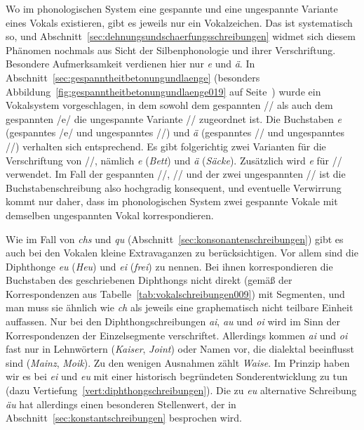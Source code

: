 Wo im phonologischen System eine gespannte und eine ungespannte Variante eines Vokals existieren, gibt es jeweils nur ein Vokalzeichen.
Das ist systematisch so, und Abschnitt~\ref{sec:dehnungsundschaerfungsschreibungen} widmet sich diesem Phänomen nochmals aus Sicht der Silbenphonologie und ihrer Verschriftung.
Besondere Aufmerksamkeit verdienen hier nur \textit{e} und \textit{ä}.
In Abschnitt~\ref{sec:gespanntheitbetonungundlaenge} (besonders Abbildung~\ref{fig:gespanntheitbetonungundlaenge019} auf Seite~\pageref{fig:gespanntheitbetonungundlaenge019}) wurde ein Vokalsystem vorgeschlagen, in dem sowohl dem gespannten // als auch dem gespannten /e/ die ungespannte Variante // zugeordnet ist.
Die Buchstaben \textit{e} (gespanntes /e/ und ungespanntes //) und \textit{ä} (gespanntes // und ungespanntes //) verhalten sich entsprechend.
Es gibt folgerichtig zwei Varianten für die Verschriftung von //, nämlich \textit{e} (\textit{Bett}) und \textit{ä} (\textit{Säcke}).
Zusätzlich wird \textit{e} für // verwendet.
Im Fall der gespannten //, // und der zwei ungespannten // ist die Buchstabenschreibung also hochgradig konsequent, und eventuelle Verwirrung kommt nur daher, dass im phonologischen System zwei gespannte Vokale mit demselben ungespannten Vokal korrespondieren.

Wie im Fall von \textit{chs} und \textit{qu} (Abschnitt~\ref{sec:konsonantenschreibungen}) gibt es auch bei den Vokalen kleine Extravaganzen zu berücksichtigen.
Vor allem sind die Diphthonge \textit{eu} (\textit{Heu}) und \textit{ei} (\textit{frei}) zu nennen.
Bei ihnen korrespondieren die Buchstaben des geschriebenen Diphthongs nicht direkt (gemäß der Korrespondenzen aus Tabelle~\ref{tab:vokalschreibungen009}) mit Segmenten, und man muss sie ähnlich wie \textit{ch} als jeweils eine graphematisch nicht teilbare Einheit auffassen.
Nur bei den Diphthongschreibungen \textit{ai}, \textit{au} und \textit{oi} wird im Sinn der Korrespondenzen der Einzelsegmente verschriftet.
Allerdings kommen \textit{ai} und \textit{oi} fast nur in Lehnwörtern (\textit{Kaiser}, \textit{Joint}) oder Namen vor, die dialektal beeinflusst sind (\textit{Mainz}, \textit{Moik}).
Zu den wenigen Ausnahmen zählt \textit{Waise}.
Im Prinzip haben wir es bei \textit{ei} und \textit{eu} mit einer historisch begründeten Sonderentwicklung zu tun (dazu Vertiefung~\ref{vert:diphthongschreibungen}).
Die zu \textit{eu} alternative Schreibung \textit{äu} hat allerdings einen besonderen Stellenwert, der in Abschnitt~\ref{sec:konstantschreibungen} besprochen wird.

